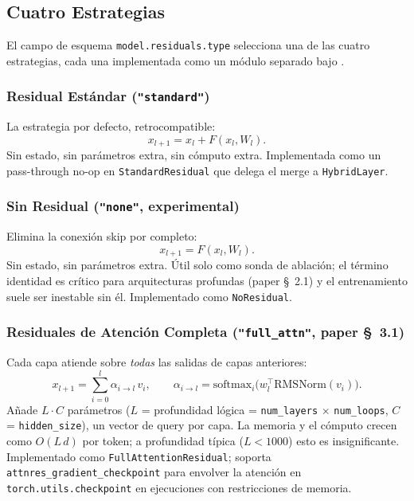 \subsection{Cuatro Estrategias}

El campo de esquema \texttt{model.residuals.type} selecciona una de las
cuatro estrategias, cada una implementada como un módulo separado bajo
.

\subsubsection{Residual Estándar (\texttt{"standard"})}

La estrategia por defecto, retrocompatible:
\[
x_{l+1} = x_l + F(x_l, W_l).
\]
Sin estado, sin parámetros extra, sin cómputo extra. Implementada como
un pass-through no-op en \texttt{StandardResidual} que delega el merge
a \texttt{HybridLayer}.

\subsubsection{Sin Residual (\texttt{"none"}, experimental)}

Elimina la conexión skip por completo:
\[
x_{l+1} = F(x_l, W_l).
\]
Sin estado, sin parámetros extra. Útil solo como sonda de ablación; el
término identidad es crítico para arquitecturas profundas (paper
\S~2.1) y el entrenamiento suele ser inestable sin él. Implementado
como \texttt{NoResidual}.

\subsubsection{Residuales de Atención Completa (\texttt{"full\_attn"}, paper \S~3.1)}

Cada capa atiende sobre \emph{todas} las salidas de capas anteriores:
\[
x_{l+1} = \sum_{i=0}^{l} \alpha_{i \to l} \, v_i, \qquad
\alpha_{i \to l} = \mathrm{softmax}_i\!\big(w_l^{\top} \mathrm{RMSNorm}(v_i)\big).
\]
Añade $L \cdot C$ parámetros ($L$ = profundidad lógica =
\texttt{num\_layers} $\times$ \texttt{num\_loops}, $C$ =
\texttt{hidden\_size}), un vector de query por capa. La memoria y el
cómputo crecen como $O(L \, d)$ por token; a profundidad típica
($L < 1000$) esto es insignificante. Implementado como
\texttt{FullAttentionResidual}; soporta
\texttt{attnres\_gradient\_checkpoint} para envolver la atención en
\texttt{torch.utils.checkpoint} en ejecuciones con restricciones de
memoria.

